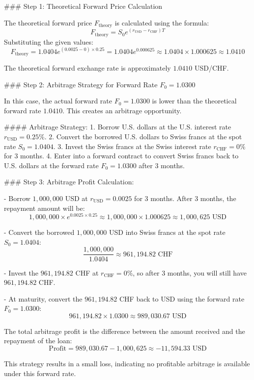 \documentclass[12pt,letterpaper, onecolumn]{exam}
\begin{document}
\begin{questions}
\begin{solution}
### Step 1: Theoretical Forward Price Calculation

The theoretical forward price \( F_{\text{theory}} \) is calculated using the formula:
\[
F_{\text{theory}} = S_0 e^{(r_{\text{USD}} - r_{\text{CHF}}) T}
\]
Substituting the given values:
\[
F_{\text{theory}} = 1.0404 e^{(0.0025 - 0) \times 0.25} = 1.0404 e^{0.000625} \approx 1.0404 \times 1.000625 \approx 1.0410
\]

The theoretical forward exchange rate is approximately \( 1.0410 \) USD/CHF.

### Step 2: Arbitrage Strategy for Forward Rate \( F_0 = 1.0300 \)

In this case, the actual forward rate \( F_0 = 1.0300 \) is lower than the theoretical forward rate \( 1.0410 \). This creates an arbitrage opportunity.

#### Arbitrage Strategy:
1. Borrow U.S. dollars at the U.S. interest rate \( r_{\text{USD}} = 0.25\% \).
2. Convert the borrowed U.S. dollars to Swiss francs at the spot rate \( S_0 = 1.0404 \).
3. Invest the Swiss francs at the Swiss interest rate \( r_{\text{CHF}} = 0\% \) for 3 months.
4. Enter into a forward contract to convert Swiss francs back to U.S. dollars at the forward rate \( F_0 = 1.0300 \) after 3 months.

### Step 3: Arbitrage Profit Calculation:

- Borrow \( 1,000,000 \) USD at \( r_{\text{USD}} = 0.0025 \) for 3 months. After 3 months, the repayment amount will be:
\[
1,000,000 \times e^{0.0025 \times 0.25} \approx 1,000,000 \times 1.000625 \approx 1,000,625 \text{ USD}
\]

- Convert the borrowed \( 1,000,000 \) USD into Swiss francs at the spot rate \( S_0 = 1.0404 \):
\[
\frac{1,000,000}{1.0404} \approx 961,194.82 \text{ CHF}
\]

- Invest the \( 961,194.82 \) CHF at \( r_{\text{CHF}} = 0\% \), so after 3 months, you will still have \( 961,194.82 \) CHF.

- At maturity, convert the \( 961,194.82 \) CHF back to USD using the forward rate \( F_0 = 1.0300 \):
\[
961,194.82 \times 1.0300 \approx 989,030.67 \text{ USD}
\]

The total arbitrage profit is the difference between the amount received and the repayment of the loan:
\[
\text{Profit} = 989,030.67 - 1,000,625 \approx -11,594.33 \text{ USD}
\]

This strategy results in a small loss, indicating no profitable arbitrage is available under this forward rate.


\end{solution}
\end{questions}
\end{document}
